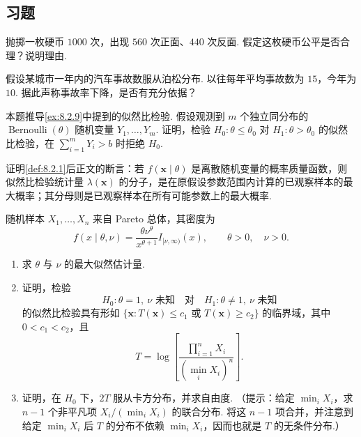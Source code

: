 \subsection{习题}\label{sec:8.4}
\setcounter{exercise}{0}
\begin{exercise}\label{exercise:8.1}
抛掷一枚硬币 $1000$ 次，出现 $560$ 次正面、$440$ 次反面. 假定这枚硬币公平是否合理？说明理由.
\end{exercise}
\begin{exercise}\label{exercise:8.2}
假设某城市一年内的汽车事故数服从泊松分布. 以往每年平均事故数为 $15$，今年为 $10$. 据此声称事故率下降，是否有充分依据？
\end{exercise}
\begin{exercise}\label{exercise:8.3}
本题推导\autoref{ex:8.2.9}中提到的似然比检验. 假设观测到 $m$ 个独立同分布的 $\operatorname{Bernoulli}(\theta)$ 随机变量 $Y_1,\ldots,Y_m$. 证明，检验 $H_0:\theta\le\theta_0$ 对 $H_1:\theta>\theta_0$ 的似然比检验，在 $\sum_{i=1}^mY_i>b$ 时拒绝 $H_0$.
\end{exercise}
\begin{exercise}\label{exercise:8.4}
证明\autoref{def:8.2.1}后正文的断言：若 $f(\boldsymbol x\mid\theta)$ 是离散随机变量的概率质量函数，则似然比检验统计量 $\lambda(\boldsymbol x)$ 的分子，是在原假设参数范围内计算的已观察样本的最大概率；其分母则是已观察样本在所有可能参数上的最大概率.
\end{exercise}
\begin{exercise}\label{exercise:8.5}
随机样本 $X_1,\ldots,X_n$ 来自 Pareto 总体，其密度为
$$f(x\mid\theta,\nu)=\frac{\theta\nu^\theta}{x^{\theta+1}}I_{[\nu,\infty)}(x),\qquad\theta>0,\quad\nu>0.$$
\begin{enumerate}
\item 求 $\theta$ 与 $\nu$ 的最大似然估计量.
\item 证明，检验
$$H_0:\theta=1,\ \nu\text{ 未知}\quad\text{对}\quad H_1:\theta\ne1,\ \nu\text{ 未知}$$
的似然比检验具有形如 $\{\boldsymbol x:T(\boldsymbol x)\le c_1\text{ 或 }T(\boldsymbol x)\ge c_2\}$ 的临界域，其中 $0<c_1<c_2$，且
$$T=\log\left[\frac{\prod_{i=1}^nX_i}{(\min_iX_i)^n}\right].$$
\item 证明，在 $H_0$ 下，$2T$ 服从卡方分布，并求自由度. （提示：给定 $\min_iX_i$，求 $n-1$ 个非平凡项 $X_i/(\min_iX_i)$ 的联合分布. 将这 $n-1$ 项合并，并注意到给定 $\min_iX_i$ 后 $T$ 的分布不依赖 $\min_iX_i$，因而也就是 $T$ 的无条件分布.）
\end{enumerate}
\end{exercise}

